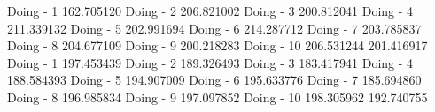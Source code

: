 Doing - 1 162.705120 Doing - 2 206.821002 Doing - 3 200.812041 Doing - 4 211.339132 Doing - 5 202.991694 Doing - 6 214.287712 Doing - 7 203.785837 Doing - 8 204.677109 Doing - 9 200.218283 Doing - 10 206.531244 201.416917
Doing - 1 197.453439 Doing - 2 189.326493 Doing - 3 183.417941 Doing - 4 188.584393 Doing - 5 194.907009 Doing - 6 195.633776 Doing - 7 185.694860 Doing - 8 196.985834 Doing - 9 197.097852 Doing - 10 198.305962 192.740755
